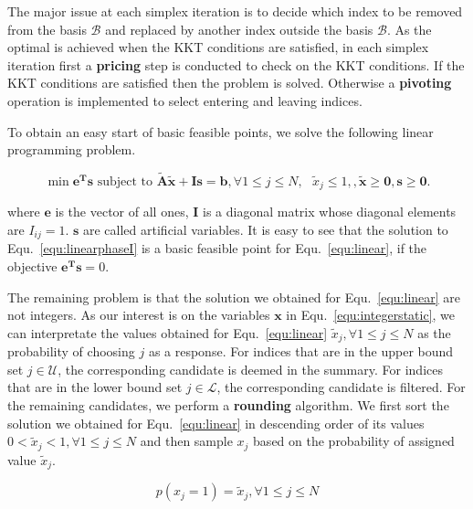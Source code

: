 \documentclass[envcountsame]{llncs}
\begin{document}
The major issue at each simplex iteration is to decide which index to be removed from the basis $\mathcal{B}$ and replaced by another index outside the basis $\mathcal{B}$.  As the optimal is achieved when the KKT conditions are satisfied, in each simplex iteration first  a \textbf{pricing} step is conducted to check on the KKT conditions.  If the KKT conditions are satisfied then the problem is solved. Otherwise a \textbf{pivoting} operation is implemented to select entering and leaving indices.

To obtain an easy start of basic feasible points, we solve the following linear programming problem.

\vspace{-0.6cm}
\begin{equation}\label{equ:linearphaseI}
\min \mathbf{e^{T}s} \textrm{ subject to } \tilde{\mathbf{A}}\tilde{\mathbf{x}} + \mathbf{Is} = \mathbf{b},  \forall 1\leq j\leq N,\textrm{ } \tilde{x}_j \leq 1, ,\tilde{\mathbf{x}}\geq \mathbf{0}, \mathbf{s}\geq \mathbf{0}.
\end{equation}
\vspace{-0.6cm}

where $\mathbf{e}$ is the vector of all ones, $\mathbf{I}$ is a diagonal matrix whose diagonal elements are $I_{ij}=1$. $\mathbf{s}$ are called artificial variables. It is easy to see that the solution to Equ.~\ref{equ:linearphaseI} is a basic feasible point for Equ.~\ref{equ:linear}, if the objective $\mathbf{e^{T}s}=0 $.

The remaining problem is that the solution we obtained for Equ.~\ref{equ:linear} are not integers. As our interest is on the variables $\mathbf{x}$ in Equ.~\ref{equ:integerstatic}, we can interpretate the values obtained for Equ.~\ref{equ:linear} $\tilde{x}_j, \forall 1\leq j\leq N $ as the probability of choosing $j$ as a response. For indices that are in the upper bound set $j \in \mathcal{U}$, the corresponding candidate is deemed in the summary. For indices that are in the lower bound set $j \in \mathcal{L}$, the corresponding candidate is filtered. For the remaining candidates, we perform a \textbf{rounding} algorithm. We first sort the solution we obtained for Equ.~\ref{equ:linear} in descending order of its values $0< \tilde{x}_j< 1,\forall 1\leq j\leq N$ and then sample $x_j$ based on the probability of assigned value $\tilde{x}_j$.

\vspace{-0.3cm}
\begin{equation}
p(x_j=1)= \tilde{x}_j, \forall 1\leq j \leq N
\end{equation}
\vspace{-0.6cm}
\end{document}
